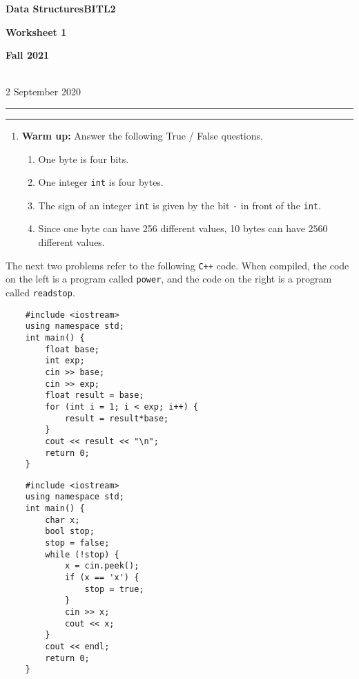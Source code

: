 \documentclass[a4paper,12pt]{article}
\begin{document}
\begin{center}
\parbox{3.5cm}{\flushleft\bf Data Structures\linebreak BITL2} \hfill {\bf\Huge Worksheet 1} \hfill \parbox{3.5cm}{\flushright\bf Fall 2021} \\[8pt]
\rm\small 2 September 2020
\end{center}

\hrule\vspace{2pt}\hrule

\begin{enumerate}

\item \textbf{Warm up:} Answer the following True / False questions.
\begin{enumerate}
\item One byte is four bits.
\item One integer \texttt{int} is four bytes.
\item The sign of an integer \texttt{int} is given by the bit \texttt{-} in front of the \texttt{int}.
\item Since one byte can have 256 different values, 10 bytes can have $2560$ different values.
\end{enumerate}
\end{enumerate}

\vfill
\noindent
The next two problems refer to the following \texttt{C++} code. When compiled, the code on the left is a program called \texttt{power}, and the code on the right is a program called \texttt{readstop}.
\begin{multicols}{2}
{\fontsize{9}{10}\selectfont
\begin{verbatim}
    #include <iostream>
    using namespace std;
    int main() {
        float base;
        int exp;
        cin >> base;
        cin >> exp;
        float result = base;
        for (int i = 1; i < exp; i++) {
            result = result*base;
        }
        cout << result << "\n";
        return 0;
    }

\end{verbatim}
}
{\fontsize{9}{10}\selectfont
\begin{verbatim}
    #include <iostream>
    using namespace std;
    int main() {
        char x;
        bool stop;
        stop = false;
        while (!stop) {
            x = cin.peek();
            if (x == 'x') {
                stop = true;
            }
            cin >> x;
            cout << x;
        }
        cout << endl;
        return 0;
    }
\end{verbatim}
}
\end{multicols}
\end{document}
